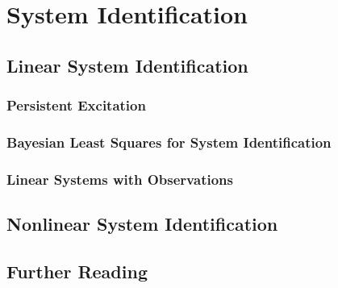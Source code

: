 \chapter{System Identification}


\section{Linear System Identification}


\subsection{Persistent Excitation}

\subsection{Bayesian Least Squares for System Identification}

\subsection{Linear Systems with Observations}

\section{Nonlinear System Identification}


\section{Further Reading}

